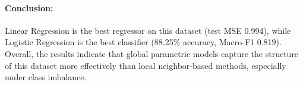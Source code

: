 \documentclass[10pt, twocolumn, letterpaper]{article}
\begin{document}
\paragraph{Conclusion:} Linear Regression is the best regressor on this dataset (test MSE 0.994), while Logistic Regression is the best classifier (88.25\% accuracy, Macro-F1 0.819). Overall, the results indicate that global parametric models capture the structure of this dataset more effectively than local neighbor-based methods, especially under class imbalance.
\end{document}

